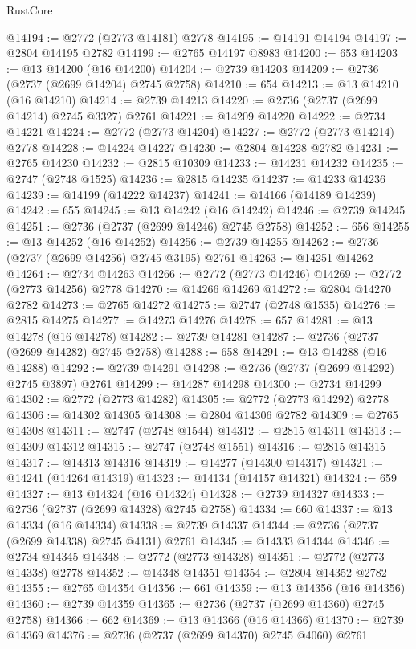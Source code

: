 \begin{lexlean}{RustCore}
\begin{coremodule}
@14194 := @2772 (@2773 @14181) @2778
@14195 := @14191 @14194
@14197 := @2804 @14195 @2782
@14199 := @2765 @14197 @8983
@14200 := 653
@14203 := @13 @14200 (@16 @14200)
@14204 := @2739 @14203
@14209 := @2736 (@2737 (@2699 @14204) @2745 @2758)
@14210 := 654
@14213 := @13 @14210 (@16 @14210)
@14214 := @2739 @14213
@14220 := @2736 (@2737 (@2699 @14214) @2745 @3327) @2761
@14221 := @14209 @14220
@14222 := @2734 @14221
@14224 := @2772 (@2773 @14204)
@14227 := @2772 (@2773 @14214) @2778
@14228 := @14224 @14227
@14230 := @2804 @14228 @2782
@14231 := @2765 @14230
@14232 := @2815 @10309
@14233 := @14231 @14232
@14235 := @2747 (@2748 @1525)
@14236 := @2815 @14235
@14237 := @14233 @14236
@14239 := @14199 (@14222 @14237)
@14241 := @14166 (@14189 @14239)
@14242 := 655
@14245 := @13 @14242 (@16 @14242)
@14246 := @2739 @14245
@14251 := @2736 (@2737 (@2699 @14246) @2745 @2758)
@14252 := 656
@14255 := @13 @14252 (@16 @14252)
@14256 := @2739 @14255
@14262 := @2736 (@2737 (@2699 @14256) @2745 @3195) @2761
@14263 := @14251 @14262
@14264 := @2734 @14263
@14266 := @2772 (@2773 @14246)
@14269 := @2772 (@2773 @14256) @2778
@14270 := @14266 @14269
@14272 := @2804 @14270 @2782
@14273 := @2765 @14272
@14275 := @2747 (@2748 @1535)
@14276 := @2815 @14275
@14277 := @14273 @14276
@14278 := 657
@14281 := @13 @14278 (@16 @14278)
@14282 := @2739 @14281
@14287 := @2736 (@2737 (@2699 @14282) @2745 @2758)
@14288 := 658
@14291 := @13 @14288 (@16 @14288)
@14292 := @2739 @14291
@14298 := @2736 (@2737 (@2699 @14292) @2745 @3897) @2761
@14299 := @14287 @14298
@14300 := @2734 @14299
@14302 := @2772 (@2773 @14282)
@14305 := @2772 (@2773 @14292) @2778
@14306 := @14302 @14305
@14308 := @2804 @14306 @2782
@14309 := @2765 @14308
@14311 := @2747 (@2748 @1544)
@14312 := @2815 @14311
@14313 := @14309 @14312
@14315 := @2747 (@2748 @1551)
@14316 := @2815 @14315
@14317 := @14313 @14316
@14319 := @14277 (@14300 @14317)
@14321 := @14241 (@14264 @14319)
@14323 := @14134 (@14157 @14321)
@14324 := 659
@14327 := @13 @14324 (@16 @14324)
@14328 := @2739 @14327
@14333 := @2736 (@2737 (@2699 @14328) @2745 @2758)
@14334 := 660
@14337 := @13 @14334 (@16 @14334)
@14338 := @2739 @14337
@14344 := @2736 (@2737 (@2699 @14338) @2745 @4131) @2761
@14345 := @14333 @14344
@14346 := @2734 @14345
@14348 := @2772 (@2773 @14328)
@14351 := @2772 (@2773 @14338) @2778
@14352 := @14348 @14351
@14354 := @2804 @14352 @2782
@14355 := @2765 @14354
@14356 := 661
@14359 := @13 @14356 (@16 @14356)
@14360 := @2739 @14359
@14365 := @2736 (@2737 (@2699 @14360) @2745 @2758)
@14366 := 662
@14369 := @13 @14366 (@16 @14366)
@14370 := @2739 @14369
@14376 := @2736 (@2737 (@2699 @14370) @2745 @4060) @2761

\end{coremodule}
\end{lexlean}
